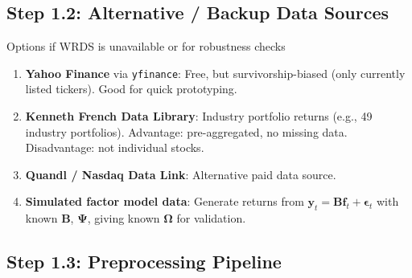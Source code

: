 \documentclass[11pt,a4paper]{article}
\newcommand{\bOmega}{\bm{\Omega}}
\begin{document}
\subsection{Step 1.2: Alternative / Backup Data Sources}

\begin{datanote}{Options if WRDS is unavailable or for robustness checks}
\begin{enumerate}
  \item \textbf{Yahoo Finance} via \texttt{yfinance}: Free, but survivorship-biased (only currently listed tickers). Good for quick prototyping.
  \item \textbf{Kenneth French Data Library}: Industry portfolio returns (e.g., 49 industry portfolios). Advantage: pre-aggregated, no missing data. Disadvantage: not individual stocks.
  \item \textbf{Quandl / Nasdaq Data Link}: Alternative paid data source.
  \item \textbf{Simulated factor model data}: Generate returns from $\bm{y}_t = \bm{B}\bm{f}_t + \bm{\epsilon}_t$ with known $\bm{B}$, $\bm{\Psi}$, giving known $\bOmega$ for validation.
\end{enumerate}
\end{datanote}

\subsection{Step 1.3: Preprocessing Pipeline}
\end{document}
